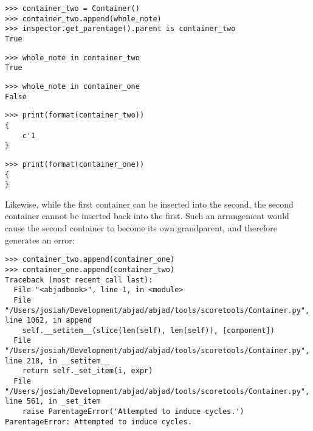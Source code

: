 \begin{comment}
<abjad>
container_two = Container()
container_two.append(whole_note)
inspector.get_parentage().parent is container_two
whole_note in container_two
whole_note in container_one
print(format(container_two))
print(format(container_one))
</abjad>
\end{comment}

\begin{abjadbookoutput}
\begin{singlespacing}
\vspace{-0.5\baselineskip}
\begin{verbatim}
>>> container_two = Container()
>>> container_two.append(whole_note)
>>> inspector.get_parentage().parent is container_two
True
\end{verbatim}
\begin{verbatim}
>>> whole_note in container_two
True
\end{verbatim}
\begin{verbatim}
>>> whole_note in container_one
False
\end{verbatim}
\begin{verbatim}
>>> print(format(container_two))
{
    c'1
}
\end{verbatim}
\begin{verbatim}
>>> print(format(container_one))
{
}
\end{verbatim}
\end{singlespacing}
\end{abjadbookoutput}

\noindent Likewise, while the first container can be inserted into the second,
the second container cannot be inserted back into the first. Such an
arrangement would cause the second container to become its own grandparent, and
therefore generates an error:

\begin{comment}
<abjad>[allow_exceptions]
container_two.append(container_one)
container_one.append(container_two)
</abjad>
\end{comment}

\begin{abjadbookoutput}
\begin{singlespacing}
\vspace{-0.5\baselineskip}
\begin{verbatim}
>>> container_two.append(container_one)
>>> container_one.append(container_two)
Traceback (most recent call last):
  File "<abjadbook>", line 1, in <module>
  File "/Users/josiah/Development/abjad/abjad/tools/scoretools/Container.py", line 1062, in append
    self.__setitem__(slice(len(self), len(self)), [component])
  File "/Users/josiah/Development/abjad/abjad/tools/scoretools/Container.py", line 218, in __setitem__
    return self._set_item(i, expr)
  File "/Users/josiah/Development/abjad/abjad/tools/scoretools/Container.py", line 561, in _set_item
    raise ParentageError('Attempted to induce cycles.')
ParentageError: Attempted to induce cycles.
\end{verbatim}
\end{singlespacing}
\end{abjadbookoutput}

